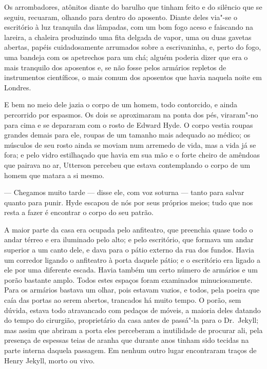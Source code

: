 Os arrombadores, atônitos diante do barulho que tinham feito e do
silêncio que se seguiu, recuaram, olhando para dentro do aposento. 
Diante deles via"-se o escritório à luz tranquila das lâmpadas, com um
bom fogo aceso e faiscando na lareira, a chaleira produzindo uma fita
delgada de vapor, uma ou duas gavetas abertas, papéis cuidadosamente
arrumados sobre a escrivaninha, e, perto do fogo, uma bandeja com os
apetrechos para um chá; alguém poderia dizer que era o mais tranquilo
dos aposentos e, se não fosse pelos armários repletos de instrumentos
científicos, o mais comum dos aposentos que havia naquela noite em
Londres.

E bem no meio dele jazia o corpo de um homem, todo contorcido, e ainda
percorrido por espasmos.  Os dois se aproximaram na ponta dos pés,
viraram"-no para cima e se depararam com o rosto de Edward Hyde.  O
corpo vestia roupas grandes demais para ele, roupas de um tamanho mais
adequado ao médico; os músculos de seu rosto ainda se moviam num
arremedo de vida, mas a vida já se fora; e pelo vidro estilhaçado que
havia em sua mão e o forte cheiro de amêndoas que pairava no ar,
Utterson percebeu que estava contemplando o corpo de um homem que
matara a si mesmo.

--- Chegamos muito tarde --- disse ele, com voz soturna --- tanto para
salvar quanto para punir.  Hyde escapou de nós por seus próprios meios;
tudo que nos resta a fazer é encontrar o corpo do seu patrão.

A maior parte da casa era ocupada pelo anfiteatro, que preenchia quase
todo o andar térreo e era iluminado pelo alto; e pelo escritório, que
formava um andar superior a um canto dele, e dava para o pátio externo
da rua dos fundos.  Havia um corredor ligando o anfiteatro à porta
daquele pátio; e o escritório era ligado a ele por uma diferente
escada.  Havia também um certo número de armários e um porão bastante
amplo. Todos estes espaços foram examinados minuciosamente.  Para os
armários bastava um olhar, pois estavam vazios, e todos, pela poeira
que caía das portas ao serem abertos, trancados há muito tempo.  O
porão, sem dúvida, estava todo atravancado com pedaços de móveis, a
maioria deles datando do tempo do cirurgião, proprietário da casa antes
de passá"-la para o Dr.~Jekyll; mas assim que abriram a porta eles
perceberam a inutilidade de procurar ali, pela presença de espessas
teias de aranha que durante anos tinham sido tecidas na parte interna
daquela passagem.  Em nenhum outro lugar encontraram traços de Henry
Jekyll, morto ou vivo.

